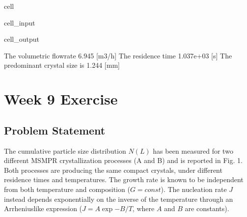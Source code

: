 \documentclass[letterpaper,10pt,english]{jupyterBook}
\begin{document}
\begin{sphinxuseclass}{cell}
\begin{sphinxVerbatimInput}
\begin{sphinxuseclass}{cell_input}
\end{sphinxuseclass}\end{sphinxVerbatimInput}
\begin{sphinxVerbatimOutput}

\begin{sphinxuseclass}{cell_output}
\begin{sphinxVerbatim}[commandchars=\\\{\}]
The volumetric flowrate  6.945 [m3/h]
The residence time  1.037e+03 [s]
The predominant crystal size is  1.244  [mm]
\end{sphinxVerbatim}

\end{sphinxuseclass}\end{sphinxVerbatimOutput}

\end{sphinxuseclass}
\sphinxstepscope


\section{Week 9 \sphinxhyphen{} Exercise}
\label{\detokenize{Exercise_W9_2021:week-9-exercise}}\label{\detokenize{Exercise_W9_2021::doc}}

\subsection{Problem Statement}
\label{\detokenize{Exercise_W9_2021:problem-statement}}
\sphinxAtStartPar
The cumulative particle size distribution \(N(L)\) has been measured for two different MSMPR crystallization processes (A and B) and is reported in Fig. 1. Both processes are producing the same compact crystals, under different residence times and temperatures. The growth rate is known to be independent from both temperature and composition (\(G=const\)). The nucleation rate \(J\) instead depends exponentially on the inverse of the temperature through an Arrhenius\sphinxhyphen{}like expression (\(J=A\exp{-B/T}\),  where \(A\) and \(B\) are constants).
\end{document}
